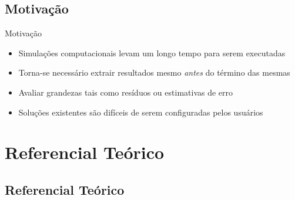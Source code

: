\documentclass[12pt,compress,final]{beamer}
\begin{document}

\subsection*{Motivação}

\begin{frame}{Motivação}

\begin{itemize}
    \item Simulações computacionais levam um \alert{longo tempo} para serem executadas %
    \item Torna-se necessário extrair resultados mesmo \emph{antes} do término das mesmas
    \item Avaliar grandezas tais como resíduos ou estimativas de erro
    \item Soluções existentes são difíceis de serem configuradas pelos usuários
\end{itemize}

\end{frame}


\section{Referencial Teórico}
\subsection*{Referencial Teórico}
\end{document}
